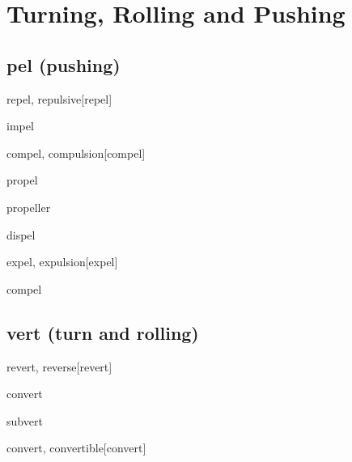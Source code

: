 \chapter{Turning, Rolling and Pushing}

\section{pel (pushing)}

\begin{wordRef}{repel, repulsive}[repel]
\end{wordRef}

\begin{wordRef}{impel}
\end{wordRef}

\begin{wordRef}{compel,  compulsion}[compel]
\end{wordRef}

\begin{wordRef}{propel}
 \end{wordRef}


\begin{wordRef}{propeller}
\end{wordRef}

\begin{wordRef}{dispel}
\end{wordRef}

\begin{wordRef}{expel, expulsion}[expel]
\end{wordRef}

\begin{wordRef}{compel}
\end{wordRef}



\section{vert (turn and rolling)}

\begin{wordRef}{revert, reverse}[revert]
\end{wordRef}

\begin{wordRef}{convert}
\end{wordRef}

\begin{wordRef}{subvert}
\end{wordRef}

\begin{wordRef}{convert, convertible}[convert]
\end{wordRef}

